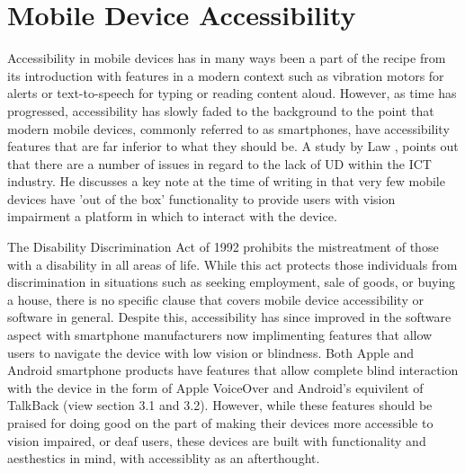 
\section{Mobile Device Accessibility}
Accessibility in mobile devices has in many ways been a part of the recipe from its introduction with features in a modern context such as vibration motors for alerts or text-to-speech for typing or reading content aloud.
However, as time has progressed, accessibility has slowly faded to the background to the point that modern mobile devices, commonly referred to as smartphones, have accessibility features that are far inferior to what they should be. %
A study by Law \cite{cellphone}, points out that there are a number of issues in regard to the lack of UD within the ICT industry. %
He discusses a key note at the time of writing in that very few mobile devices have 'out of the box' functionality to provide users with vision impairment a platform in which to interact with the device. %

The Disability Discrimination Act of 1992 \cite{dda1992} prohibits the mistreatment of those with a disability in all areas of life.
While this act protects those individuals from discrimination in situations such as seeking employment, sale of goods, or buying a house, there is no specific clause that covers mobile device accessibility or software in general.
Despite this, accessibility has since improved in the software aspect with smartphone manufacturers now implimenting features that allow users to navigate the device with low vision or blindness.
Both Apple and Android smartphone products have features that allow complete blind interaction with the device in the form of Apple VoiceOver \cite{iphone} and Android's equivilent of TalkBack \cite{android} (view section 3.1 and 3.2).
However, while these features should be praised for doing good on the part of making their devices more accessible to vision impaired, or deaf users, these devices are built with functionality and aesthestics in mind, with accessiblity as an afterthought.

